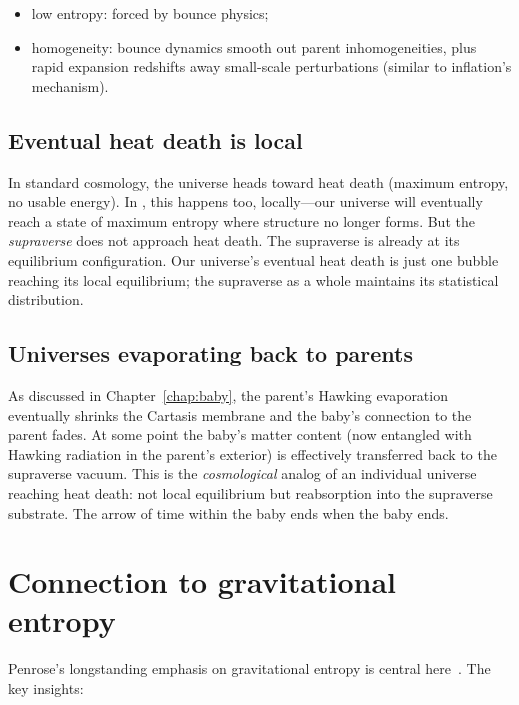 \begin{itemize}
  \item low entropy: forced by bounce physics;
  \item homogeneity: bounce dynamics smooth out parent inhomogeneities, plus
    rapid expansion redshifts away small-scale perturbations (similar to
    inflation's mechanism).
\end{itemize}

\subsection{Eventual heat death is local}

In standard cosmology, the universe heads toward heat death (maximum entropy, no
usable energy). In \SCT, this happens too, locally---our universe will eventually
reach a state of maximum entropy where structure no longer forms. But the
\emph{supraverse} does not approach heat death. The supraverse is already at its
equilibrium configuration. Our universe's eventual heat death is just one bubble
reaching its local equilibrium; the supraverse as a whole maintains its
statistical distribution.

\subsection{Universes evaporating back to parents}

As discussed in Chapter~\ref{chap:baby}, the parent's Hawking evaporation
eventually shrinks the Cartasis membrane and the baby's connection to the parent
fades. At some point the baby's matter content (now entangled with Hawking
radiation in the parent's exterior) is effectively transferred back to the
supraverse vacuum. This is the \emph{cosmological} analog of an individual
universe reaching heat death: not local equilibrium but reabsorption into the
supraverse substrate. The arrow of time within the baby ends when the baby ends.

\section{Connection to gravitational entropy}

Penrose's longstanding emphasis on gravitational entropy is central
here~\citep{penrose1979}. The key insights:

